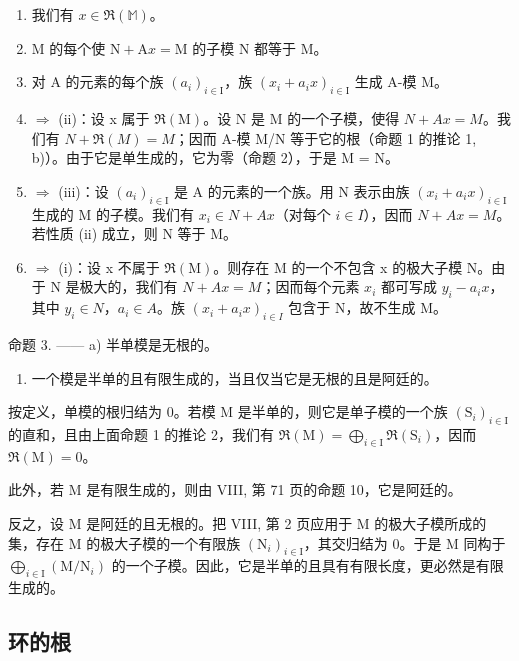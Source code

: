 \begin{enumerate}
\def\labelenumi{(\roman{enumi})}
\item
  我们有 \(x \in \Re(\mathbb{M})\)。
\item
  M 的每个使 \(\mathrm{N} + \mathrm{A}x = \mathrm{M}\) 的子模 N 都等于 M。
\item
  对 A 的元素的每个族 \((a_{i})_{i\in\mathrm{I}}\)，族 \((x_{i}+a_{i}x)_{i\in\mathrm{I}}\) 生成 A-模 M。
\item
  \(\Rightarrow\) (ii)：设 x 属于 \(\Re(\mathrm{M})\)。设 N 是 M 的一个子模，使得 \(N + Ax = M\)。我们有 \(N + \Re(M) = M\)；因而 A-模 M/N 等于它的根（命题 1 的推论 1, b)）。由于它是单生成的，它为零（命题 2），于是 M = N。
\item
  \(\Rightarrow\) (iii)：设 \((a_{i})_{i\in\mathrm{I}}\) 是 A 的元素的一个族。用 N 表示由族 \((x_{i}+a_{i}x)_{i\in\mathrm{I}}\) 生成的 M 的子模。我们有 \(x_{i}\in N+Ax\)（对每个 \(i\in I\)），因而 \(N+Ax=M\)。若性质 (ii) 成立，则 N 等于 M。
\item
  \(\Rightarrow\) (i)：设 x 不属于 \(\Re(\mathrm{M})\)。则存在 M 的一个不包含 x 的极大子模 N。由于 N 是极大的，我们有 \(N + Ax = M\)；因而每个元素 \(x_{i}\) 都可写成 \(y_{i} - a_{i}x\)，其中 \(y_{i} \in N\)，\(a_{i} \in A\)。族 \((x_{i} + a_{i}x)_{i \in I}\) 包含于 N，故不生成 M。
\end{enumerate}

命题 3. —— a) 半单模是无根的。

\begin{enumerate}
\def\labelenumi{\alph{enumi})}
\setcounter{enumi}{1}
\tightlist
\item
  一个模是半单的且有限生成的，当且仅当它是无根的且是阿廷的。
\end{enumerate}

按定义，单模的根归结为 0。若模 M 是半单的，则它是单子模的一个族 \((\mathrm{S}_{i})_{i\in\mathrm{I}}\) 的直和，且由上面命题 1 的推论 2，我们有 \(\mathfrak{R}(\mathrm{M})=\bigoplus_{i\in\mathrm{I}}\mathfrak{R}(\mathrm{S}_{i})\)，因而 \(\mathfrak{R}(\mathrm{M})=0\)。

此外，若 M 是有限生成的，则由 VIII, 第 71 页的命题 10，它是阿廷的。

反之，设 M 是阿廷的且无根的。把 VIII, 第 2 页应用于 M 的极大子模所成的集，存在 M 的极大子模的一个有限族 \((\mathrm{N}_{i})_{i\in\mathrm{I}}\)，其交归结为 0。于是 M 同构于 \(\bigoplus_{i\in\mathrm{I}}(\mathrm{M}/\mathrm{N}_{i})\) 的一个子模。因此，它是半单的且具有有限长度，更必然是有限生成的。

\subsection{环的根}

